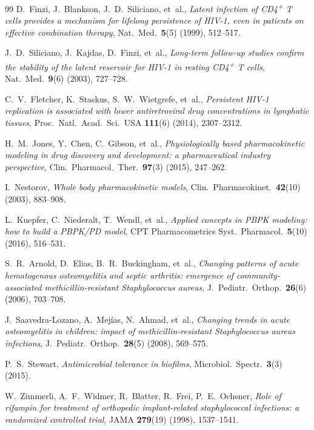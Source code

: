 \documentclass[11pt]{article}
\theoremstyle{plain}
\theoremstyle{definition}
\begin{document}
\begin{thebibliography}{99}
D.~Finzi, J.~Blankson, J.~D.~Siliciano, et~al.,
\textit{Latent infection of CD4\textsuperscript{+} T cells provides a
mechanism for lifelong persistence of HIV-1, even in patients on
effective combination therapy},
Nat.\ Med.\ \textbf{5}(5) (1999), 512--517.

J.~D.~Siliciano, J.~Kajdas, D.~Finzi, et~al.,
\textit{Long-term follow-up studies confirm the stability of the latent
reservoir for HIV-1 in resting CD4\textsuperscript{+} T cells},
Nat.\ Med.\ \textbf{9}(6) (2003), 727--728.

C.~V.~Fletcher, K.~Staskus, S.~W.~Wietgrefe, et~al.,
\textit{Persistent HIV-1 replication is associated with lower antiretroviral
drug concentrations in lymphatic tissues},
Proc.\ Natl.\ Acad.\ Sci.\ USA \textbf{111}(6) (2014), 2307--2312.

H.~M.~Jones, Y.~Chen, C.~Gibson, et~al.,
\textit{Physiologically based pharmacokinetic modeling in drug discovery
and development: a pharmaceutical industry perspective},
Clin.\ Pharmacol.\ Ther.\ \textbf{97}(3) (2015), 247--262.

I.~Nestorov,
\textit{Whole body pharmacokinetic models},
Clin.\ Pharmacokinet.\ \textbf{42}(10) (2003), 883--908.

L.~Kuepfer, C.~Niederalt, T.~Wendl, et~al.,
\textit{Applied concepts in PBPK modeling: how to build a PBPK/PD model},
CPT Pharmacometrics Syst.\ Pharmacol.\ \textbf{5}(10) (2016), 516--531.

S.~R.~Arnold, D.~Elias, B.~R.~Buckingham, et~al.,
\textit{Changing patterns of acute hematogenous osteomyelitis and septic
arthritis: emergence of community-associated methicillin-resistant
Staphylococcus aureus},
J.~Pediatr.\ Orthop.\ \textbf{26}(6) (2006), 703--708.

J.~Saavedra-Lozano, A.~Mej\'ias, N.~Ahmad, et~al.,
\textit{Changing trends in acute osteomyelitis in children: impact of
methicillin-resistant Staphylococcus aureus infections},
J.~Pediatr.\ Orthop.\ \textbf{28}(5) (2008), 569--575.

P.~S.~Stewart,
\textit{Antimicrobial tolerance in biofilms},
Microbiol.\ Spectr.\ \textbf{3}(3) (2015).

W.~Zimmerli, A.~F.~Widmer, R.~Blatter, R.~Frei, P.~E.~Ochsner,
\textit{Role of rifampin for treatment of orthopedic implant-related
staphylococcal infections: a randomized controlled trial},
JAMA \textbf{279}(19) (1998), 1537--1541.


\end{thebibliography}
\end{document}
